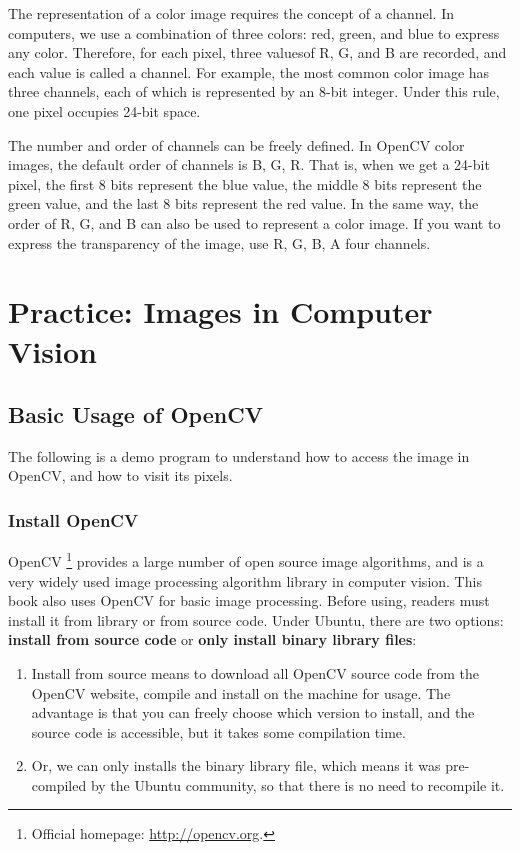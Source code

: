 The representation of a color image requires the concept of a channel. In computers, we use a combination of three colors: red, green, and blue to express any color. Therefore, for each pixel, three values ​​of R, G, and B are recorded, and each value is called a channel. For example, the most common color image has three channels, each of which is represented by an 8-bit integer. Under this rule, one pixel occupies 24-bit space.

The number and order of channels can be freely defined. In OpenCV color images, the default order of channels is B, G, R. That is, when we get a 24-bit pixel, the first 8 bits represent the blue value, the middle 8 bits represent the green value, and the last 8 bits represent the red value. In the same way, the order of R, G, and B can also be used to represent a color image. If you want to express the transparency of the image, use R, G, B, A four channels.

\section{Practice: Images in Computer Vision}
\subsection{Basic Usage of OpenCV}
The following is a demo program to understand how to access the image in OpenCV, and how to visit its pixels.

\subsubsection{Install OpenCV}
OpenCV \footnote {Official homepage: \url{http://opencv.org}. } provides a large number of open source image algorithms, and is a very widely used image processing algorithm library in computer vision. This book also uses OpenCV for basic image processing. Before using, readers must install it from library or from source code. Under Ubuntu, there are two options: \textbf{install from source code} or \textbf {only install binary library files}:

\begin{enumerate}
\item Install from source means to download all OpenCV source code from the OpenCV website, compile and install on the machine for usage. The advantage is that you can freely choose which version to install, and the source code is accessible, but it takes some compilation time.
\item Or, we can only installs the binary library file, which means it was pre-compiled by the Ubuntu community, so that there is no need to recompile it.
\end{enumerate}


